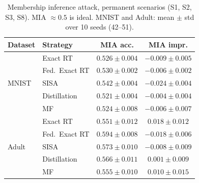 \begin{table}[H]
\centering
\caption{Membership inference attack, permanent scenarios (S1, S2, S3, S8). MIA $\approx 0.5$ is ideal. MNIST and Adult: mean $\pm$ std over 10 seeds (42--51).}
\label{tab:mia}
\small
\renewcommand{\arraystretch}{1.2}
\begin{tabular}{@{} l l c c @{}}
\toprule
\textbf{Dataset} & \textbf{Strategy} & \textbf{MIA acc.} & \textbf{MIA impr.} \\
\midrule
\multirow{5}{*}{MNIST} & Exact RT & $0.526 \pm 0.004$ & $-0.009 \pm 0.005$ \\
 & Fed.\ Exact RT & $0.530 \pm 0.002$ & $-0.006 \pm 0.002$ \\
 & SISA & $0.542 \pm 0.004$ & $-0.024 \pm 0.004$ \\
 & Distillation & $0.521 \pm 0.004$ & $-0.004 \pm 0.004$ \\
 & MF & $0.524 \pm 0.008$ & $-0.006 \pm 0.007$ \\
\midrule
\multirow{5}{*}{Adult} & Exact RT & $0.551 \pm 0.012$ & $0.018 \pm 0.012$ \\
 & Fed.\ Exact RT & $0.594 \pm 0.008$ & $-0.018 \pm 0.006$ \\
 & SISA & $0.573 \pm 0.010$ & $-0.008 \pm 0.009$ \\
 & Distillation & $0.566 \pm 0.011$ & $0.001 \pm 0.009$ \\
 & MF & $0.555 \pm 0.010$ & $0.010 \pm 0.015$ \\
\midrule
\bottomrule
\end{tabular}
\end{table}
